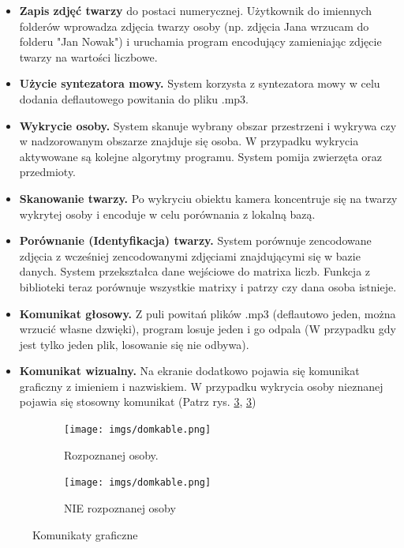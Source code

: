 \documentclass[a4paper,12pt,reqno]{article}
\begin{document}
\begin{itemize}
	\item \textcolor{edited}{\textbf{Zapis zdjęć twarzy} do postaci numerycznej. Użytkownik do imiennych folderów wprowadza zdjęcia twarzy osoby (np. zdjęcia Jana wrzucam do folderu "Jan Nowak") i uruchamia program encodujący zamieniając zdjęcie twarzy na wartości liczbowe.}
	\item \textbf{Użycie syntezatora mowy.} System korzysta z syntezatora mowy w celu dodania deflautowego powitania do pliku \textcolor{to_check_at_end}{.mp3.}
	\item \textbf{Wykrycie osoby.} System skanuje wybrany obszar przestrzeni i wykrywa czy w nadzorowanym obszarze znajduje się osoba. W przypadku wykrycia aktywowane są kolejne algorytmy programu. System pomija zwierzęta oraz przedmioty.
	\item \textbf{Skanowanie  twarzy.} Po wykryciu obiektu kamera koncentruje się na twarzy wykrytej osoby i encoduje w celu porównania z lokalną bazą.
	\item \textbf{Porównanie (Identyfikacja) twarzy.} \textcolor{edited}{System porównuje zencodowane zdjęcia z wcześniej zencodowanymi zdjęciami znajdującymi się w \textcolor{to_change}{bazie danych}. System przekształca dane wejściowe \textcolor{new}{do matrixa liczb. Funkcja z biblioteki teraz porównuje wszystkie matrixy i patrzy czy dana osoba istnieje.}}
	\item \textbf{Komunikat głosowy.} Z puli powitań plików \textcolor{to_check_at_end}{.mp3} (deflautowo jeden, można wrzucić własne dzwięki), program losuje jeden i go odpala (W przypadku gdy jest tylko jeden plik, losowanie się nie odbywa).
	\item \textbf{Komunikat wizualny.} Na ekranie dodatkowo pojawia się komunikat graficzny z imieniem i nazwiskiem. W przypadku wykrycia osoby nieznanej pojawia się stosowny komunikat (Patrz rys. \ref{komunikatgraficzny:komunikatgraficzny}, \ref{komunikatgraficzny:komunikatgraficzny})
\end{itemize}
\begin{figure}[!ht]%
	\centering
	\begin{subfigure}{.5\textwidth}
		\centering
		\texttt{[image: imgs/domkable.png]}
		\caption{Rozpoznanej osoby.}	
		\label{komunikatgraficzny:1}
	\end{subfigure}%
	\begin{subfigure}{.5\textwidth}
		\centering
		\texttt{[image: imgs/domkable.png]}
		\caption{NIE rozpoznanej osoby}
		\label{komunikatgraficzny:2}
	\end{subfigure}%
\caption{Komunikaty graficzne}
\label{komunikatgraficzny:komunikatgraficzny}
\end{figure}
\end{document}
